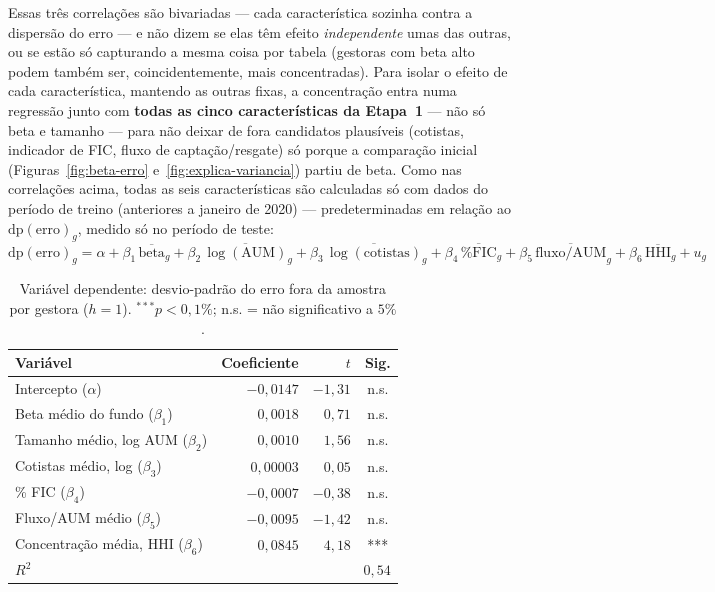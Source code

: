\documentclass[11pt,a4paper]{article}
\begin{document}
Essas três correlações são bivariadas --- cada característica sozinha contra a dispersão do
erro --- e não dizem se elas têm efeito \emph{independente} umas das outras, ou se estão só
capturando a mesma coisa por tabela (gestoras com beta alto podem também ser, coincidentemente,
mais concentradas). Para isolar o efeito de cada característica, mantendo as outras fixas, a
concentração entra numa regressão junto com \textbf{todas as cinco características da Etapa~1}
--- não só beta e tamanho --- para não deixar de fora candidatos plausíveis (cotistas, indicador
de FIC, fluxo de captação/resgate) só porque a comparação inicial (Figuras~\ref{fig:beta-erro}
e~\ref{fig:explica-variancia}) partiu de beta. Como nas correlações acima, todas as seis
características são calculadas só com dados do período de treino (anteriores a janeiro de 2020)
--- predeterminadas em relação ao $\text{dp}(\text{erro})_g$, medido só no período de teste:
\begin{equation}
\text{dp}(\text{erro})_g = \alpha + \beta_1\,\overline{\text{beta}}_g +
\beta_2\,\overline{\log(\text{AUM})}_g + \beta_3\,\overline{\log(\text{cotistas})}_g +
\beta_4\,\overline{\text{\%FIC}}_g + \beta_5\,\overline{\text{fluxo/AUM}}_g +
\beta_6\,\overline{\text{HHI}}_g + u_g
\label{eq:regressao-variancia}
\end{equation}

\begin{table}[h]\centering\small
\caption{Regressão múltipla (equação~\eqref{eq:regressao-variancia}): desvio-padrão do erro fora
da amostra por gestora ($h=1$, período de teste) explicado pelas cinco características da
Etapa 1 e pela concentração média, todas medidas só no período de treino. 40 gestoras.}
\label{tab:regressao-variancia}
\begin{tabular}{@{}lrrc@{}}
\toprule
Variável & Coeficiente & $t$ & Sig. \\
\midrule
Intercepto ($\alpha$) & $-0{,}0147$ & $-1{,}31$ & n.s. \\
Beta médio do fundo ($\beta_1$) & $0{,}0018$ & $0{,}71$ & n.s. \\
Tamanho médio, log AUM ($\beta_2$) & $0{,}0010$ & $1{,}56$ & n.s. \\
Cotistas médio, log ($\beta_3$) & $0{,}00003$ & $0{,}05$ & n.s. \\
\% FIC ($\beta_4$) & $-0{,}0007$ & $-0{,}38$ & n.s. \\
Fluxo/AUM médio ($\beta_5$) & $-0{,}0095$ & $-1{,}42$ & n.s. \\
Concentração média, HHI ($\beta_6$) & $0{,}0845$ & $4{,}18$ & *** \\
\midrule
$R^2$ & \multicolumn{3}{r}{$0{,}54$} \\
\bottomrule
\end{tabular}
\caption*{\footnotesize Variável dependente: desvio-padrão do erro fora da amostra por gestora
($h=1$). $^{***}p<0{,}1\%$; n.s. = não significativo a $5\%$.}
\end{table}
\end{document}
